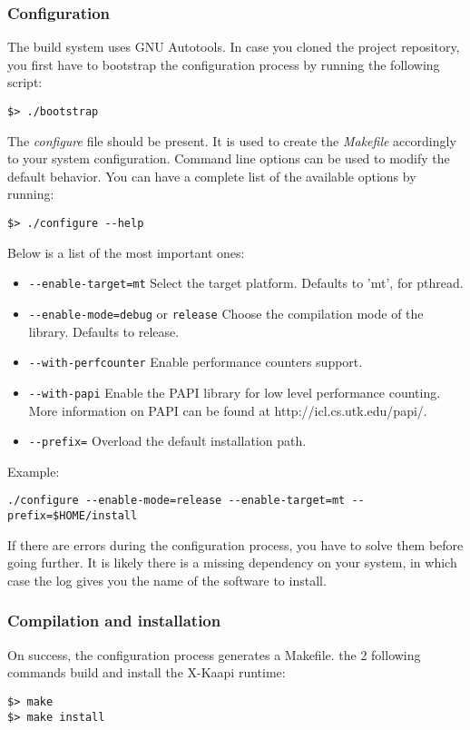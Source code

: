 \documentclass{article}
\newcommand{\kaapi}{\textsc{X}-Kaapi\xspace}
\begin{document}
\subsubsection{Configuration}
The build system uses GNU Autotools.
In case you cloned the project repository, you first have to bootstrap the
configuration process by running the following script:
\begin{verbatim}
$> ./bootstrap
\end{verbatim}
The \textit{configure} file should be present. It is used to create the
\textit{Makefile} accordingly to your system configuration. Command line
options can be used to modify the default behavior. You can have a complete
list of the available options by running:
\begin{verbatim}
$> ./configure --help
\end{verbatim}
Below is a list of the most important ones:
\begin{itemize} %
\item \verb+--enable-target=mt+\newline
Select the target platform. Defaults to 'mt', for pthread.
\item \verb+--enable-mode=debug+ or \verb+release+\newline
Choose the compilation mode of the library. Defaults to release.
\item \verb+--with-perfcounter+\newline
Enable performance counters support.
\item \verb+--with-papi+\newline
Enable the PAPI library for low level performance counting.
More information on PAPI can be found at http://icl.cs.utk.edu/papi/.
\item \verb+--prefix=+\newline
Overload the default installation path.
\end{itemize} %
Example:
\begin{verbatim}
./configure --enable-mode=release --enable-target=mt --prefix=$HOME/install
\end{verbatim}
If there are errors during the configuration process, you have to solve
them before going further. It is likely there is a missing dependency on your
system, in which case the log gives you the name of the software to install.

\subsubsection{Compilation and installation}
On success, the configuration process generates a Makefile. the 2 following
commands build and install the \kaapi runtime:
\begin{verbatim}
$> make
$> make install
\end{verbatim}
\end{document}
